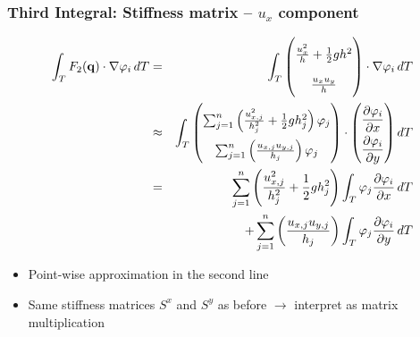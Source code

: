 \documentclass{beamer}
\newcommand{\pd}[2]{\dfrac{\partial #1}{\partial #2}}
\renewcommand{\phi}{\varphi}
\begin{document}
\begin{frame}
  \frametitle{Third Integral: Stiffness matrix -- $u_x$ component}
  \begin{eqnarray*}
    \label{sec:third-integral-second-line-1}
    \int_T F_2(\mathbf{q}) \cdot \nabla \phi_i \, dT & = &
    \int_T
    \begin{pmatrix}
      \frac{u_x^2}{h} + \frac{1}{2} g h^2 \\ \frac{u_x u_y}{h}
    \end{pmatrix}
    \cdot \nabla \phi_i \, dT \\
    \label{sec:third-integral-second-line-2}
    & \approx &
    \int_T 
    \begin{pmatrix}
      \sum_{j=1}^n \left(\frac{u_{x,j}^2}{h_j^2} + \frac{1}{2} g h_j^2\right) \phi_j \\
      \sum_{j=1}^n \left(\frac{u_{x,j} u_{y,j}}{h_j}\right) \phi_j \\
    \end{pmatrix}
    \cdot 
    {
      \renewcommand{\arraystretch}{2}
      \begin{pmatrix}
        \pd{\phi_i}{x} \\
        \pd{\phi_i}{y} 
      \end{pmatrix} dT 
    } \\
    & = & \nonumber \sum_{j=1}^n \left(\frac{u_{x,j}^2}{h_j^2} + \frac{1}{2} g h_j^2\right) \int_T \phi_j \pd{\phi_i}{x} \, dT \\ 
    & {} & + \nonumber \sum_{j=1}^n \left(\frac{u_{x,j} u_{y,j}}{h_j}\right) \int_T \phi_j \pd{\phi_i}{y} \, dT
  \end{eqnarray*}
  \begin{itemize}
  \item Point-wise approximation in the second line
  \item Same stiffness matrices $S^x$ and $S^y$ as before $\rightarrow$ interpret as matrix multiplication
  \end{itemize}
\end{frame}
\end{document}
